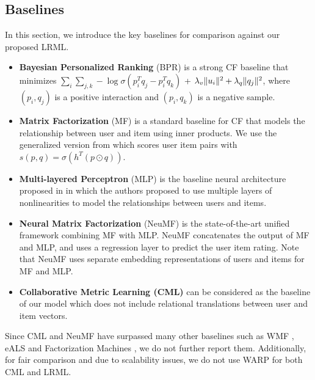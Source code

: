 \documentclass[sigconf]{acmart}
\DeclarePairedDelimiter\norm{\lVert}{\rVert}
\begin{document}
\subsection{Baselines}
In this section, we introduce the key baselines for comparison against our proposed \textsc{LRML}.
\begin{itemize}

\item \textbf{Bayesian Personalized Ranking} (BPR) \cite{DBLP:conf/uai/RendleFGS09} is a strong CF baseline that minimizes $\sum_{i} \sum_{j,k} -\log \sigma (p_i^T q_j - p_i^T q_k)$ + $\lambda_v \norm{u_i}^2 + \lambda_q \norm{q_j}^2$, where $(p_i,q_j)$ is a positive interaction and $(p_i, q_k)$ is a negative sample.

\item \textbf{Matrix Factorization} (MF) is a standard baseline for CF that models the relationship between user and item using inner products. We use the generalized version from \cite{He:2017:NCF:3038912.3052569} which scores user item pairs with $s(p,q) = \sigma(h^{T} (p \odot q))$. 
\item \textbf{Multi-layered Perceptron} (MLP) is the baseline neural architecture proposed in \cite{He:2017:NCF:3038912.3052569} in which the authors proposed to use multiple layers of nonlinearities to model the relationships between users and items. 
\item \textbf{Neural Matrix Factorization} (NeuMF) \cite{He:2017:NCF:3038912.3052569} is the state-of-the-art unified framework combining MF with MLP. NeuMF concatenates the output of MF and MLP, and uses a regression layer to predict the user item rating. Note that NeuMF uses separate embedding representations of users and items for MF and MLP. 
\item \textbf{Collaborative Metric Learning (CML)} \cite{DBLP:conf/www/HsiehYCLBE17} can be considered as the baseline of our model which does not include relational translations between user and item vectors. 
\end{itemize}
Since CML and NeuMF have surpassed many other baselines such as WMF \cite{DBLP:conf/icdm/HuKV08}, eALS \cite{DBLP:conf/sigir/HeZKC16} and Factorization Machines \cite{DBLP:conf/icdm/Rendle10}, we do not further report them.  Additionally, for fair comparison and due to scalability issues, we do not use WARP \cite{DBLP:journals/ml/WestonBU10} for both CML and \textsc{LRML}.
\end{document}
